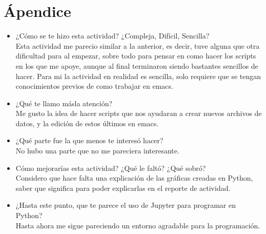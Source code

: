 \documentclass{article}
\begin{document}
\section{Ápendice}
\begin{itemize}
\item ¿Cómo se te hizo esta actividad? ¿Compleja, Difícil, Sencilla? \\ Esta actividad me parecio similar a la anterior, es decir, tuve alguna que otra dificultad para al empezar, sobre todo para pensar en como hacer los scripts en los que me apoye, aunque al final terminaron siendo bastantes sencillos de hacer. Para mi la actividad en realidad es sencilla, solo requiere que se tengan conocimientos previos de como trabajar en emacs.  
\item ¿Qué te llamo másla atención? \\ Me gusto la idea de hacer scripts que nos ayudaran a crear nuevos archivos de datos, y la edición de estos últimos en emacs. 
\item¿Qué parte fue la que menos te interesó hacer? \\ No hubo una parte que no me pareciera interesante. 
\item Cómo mejorarías esta actividad? ¿Qué le faltó? ¿Qué sobró? \\ Considero que hace falta una explicación de las gráficas creadas en Python, saber que significa para poder explicarlas en el reporte de actividad. 
\item ¿Hasta este punto, que te parece el uso de Jupyter para programar en Python? \\ Hasta ahora me sigue pareciendo un entorno agradable para la programación. 
\end{itemize}
\end{document}
